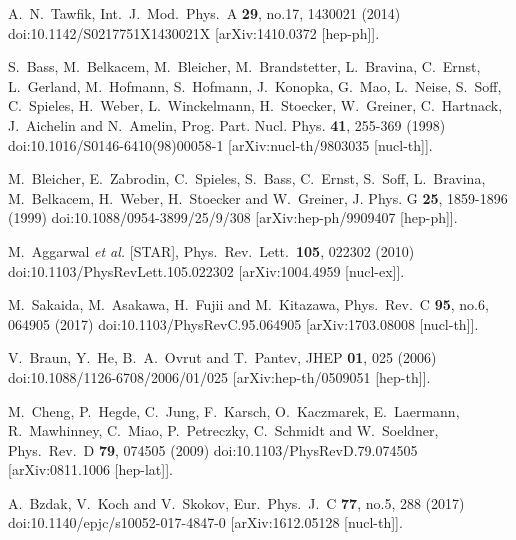 \begin{thebibliography}{99}
A.~N.~Tawfik,
Int.\ J.\ Mod.\ Phys.\ A \textbf{29}, no.17, 1430021 (2014)
doi:10.1142/S0217751X1430021X
[arXiv:1410.0372 [hep-ph]].


S.~Bass, M.~Belkacem, M.~Bleicher, M.~Brandstetter, L.~Bravina, C.~Ernst, L.~Gerland, M.~Hofmann, S.~Hofmann, J.~Konopka, G.~Mao, L.~Neise, S.~Soff, C.~Spieles, H.~Weber, L.~Winckelmann, H.~Stoecker, W.~Greiner, C.~Hartnack, J.~Aichelin and N.~Amelin,
Prog. Part. Nucl. Phys. \textbf{41}, 255-369 (1998)
doi:10.1016/S0146-6410(98)00058-1
[arXiv:nucl-th/9803035 [nucl-th]].

M.~Bleicher, E.~Zabrodin, C.~Spieles, S.~Bass, C.~Ernst, S.~Soff, L.~Bravina, M.~Belkacem, H.~Weber, H.~Stoecker and W.~Greiner,
J. Phys. G \textbf{25}, 1859-1896 (1999)
doi:10.1088/0954-3899/25/9/308
[arXiv:hep-ph/9909407 [hep-ph]].


M.~Aggarwal \textit{et al.} [STAR],
Phys.\ Rev.\ Lett.\  \textbf{105}, 022302 (2010)
doi:10.1103/PhysRevLett.105.022302
[arXiv:1004.4959 [nucl-ex]].

M.~Sakaida, M.~Asakawa, H.~Fujii and M.~Kitazawa,
Phys.\ Rev.\ C \textbf{95}, no.6, 064905 (2017)
doi:10.1103/PhysRevC.95.064905
[arXiv:1703.08008 [nucl-th]].


V.~Braun, Y.~He, B.~A.~Ovrut and T.~Pantev,
JHEP \textbf{01}, 025 (2006)
doi:10.1088/1126-6708/2006/01/025
[arXiv:hep-th/0509051 [hep-th]].

M.~Cheng, P.~Hegde, C.~Jung, F.~Karsch, O.~Kaczmarek, E.~Laermann, R.~Mawhinney, C.~Miao, P.~Petreczky, C.~Schmidt and W.~Soeldner,
Phys.\ Rev.\ D \textbf{79}, 074505 (2009)
doi:10.1103/PhysRevD.79.074505
[arXiv:0811.1006 [hep-lat]].



A.~Bzdak, V.~Koch and V.~Skokov,
Eur.\ Phys.\ J.\ C \textbf{77}, no.5, 288 (2017)
doi:10.1140/epjc/s10052-017-4847-0
[arXiv:1612.05128 [nucl-th]].



\end{thebibliography}
